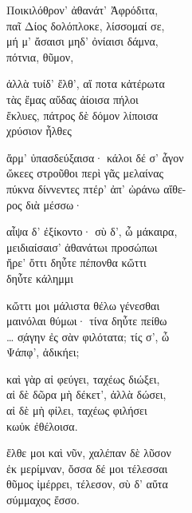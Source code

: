 \begin{gkverse}
Ποικιλόθρον’ ἀθανάτ’ Ἀφρόδιτα,\\
παῖ Δίος δολόπλοκε, λίσσομαί σε,\\
μή μ’ ἄσαισι μηδ’ ὀνίαισι δάμνα,\\
	πότνια, θῦμον,

ἀλλὰ τυίδ’ ἔλθ’, αἴ ποτα κἀτέρωτα\\
τὰς ἔμας αὔδας ἀίοισα πήλοι\\
ἔκλυες, πάτρος δὲ δόμον λίποισα\\
	χρύσιον ἦλθες

ἄρμ’ ὐπασδεύξαισα· κάλοι δέ σ’ ἆγον\\
ὤκεες στροῦθοι περὶ γᾶς μελαίνας\\
πύκνα δίννεντες πτέρ’ ἀπ’ ὠράνω αἴθε-\\
ρος διὰ μέσσω·

αἶψα δ’ ἐξίκοντο· σὺ δ’, ὦ μάκαιρα,\\
μειδιαίσαισ’ ἀθανάτωι προσώπωι\\
ἤρε’ ὄττι δηὖτε πέπονθα κὤττι\\
δηὖτε κάλημμι

κὤττι μοι μάλιστα θέλω γένεσθαι\\
μαινόλαι θύμωι· τίνα δηὖτε πείθω\\
\ldots{} σ̣άγην ἐς σὰν φιλότατα; τίς σ’, ὦ\\
Ψάπφ’, ἀδικήει;

καὶ γὰρ αἰ φεύγει, ταχέως διώξει,\\
αἰ δὲ δῶρα μὴ δέκετ’, ἀλλὰ δώσει,\\
αἰ δὲ μὴ φίλει, ταχέως φιλήσει\\
κωὐκ ἐθέλοισα.

ἔλθε μοι καὶ νῦν, χαλέπαν δὲ λῦσον\\
ἐκ μερίμναν, ὄσσα δέ μοι τέλεσσαι\\
θῦμος ἰμέρρει, τέλεσον, σὺ δ’ αὔτα\\
σύμμαχος ἔσσο. 
\end{gkverse}

\pagebreak
\section*{}

